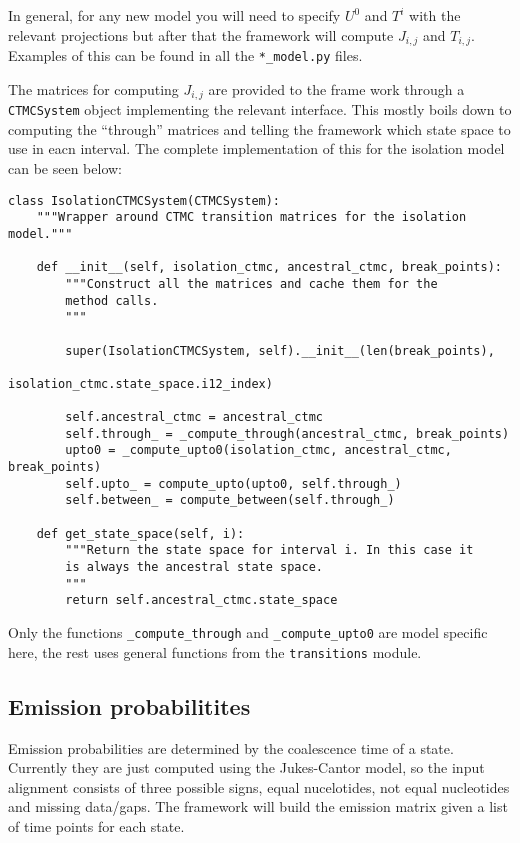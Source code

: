 \documentclass[11pt]{article}
\begin{document}
In general, for any new model you will need to specify $U^0$ and $T^i$ with the relevant projections but after that the framework will compute $J_{i,j}$ and $T_{i,j}$. Examples of this can be found in all the \texttt{*\_model.py} files.

The matrices for computing $J_{i,j}$ are provided to the frame work through a \texttt{CTMCSystem} object implementing the relevant interface. This mostly boils down to computing the ``through'' matrices and telling the framework which state space to use in eacn interval. The complete implementation of this for the isolation model can be seen below:

\begin{verbatim}
class IsolationCTMCSystem(CTMCSystem):
    """Wrapper around CTMC transition matrices for the isolation model."""

    def __init__(self, isolation_ctmc, ancestral_ctmc, break_points):
        """Construct all the matrices and cache them for the
        method calls.
        """

        super(IsolationCTMCSystem, self).__init__(len(break_points),
                                                  isolation_ctmc.state_space.i12_index)

        self.ancestral_ctmc = ancestral_ctmc
        self.through_ = _compute_through(ancestral_ctmc, break_points)
        upto0 = _compute_upto0(isolation_ctmc, ancestral_ctmc, break_points)
        self.upto_ = compute_upto(upto0, self.through_)
        self.between_ = compute_between(self.through_)

    def get_state_space(self, i):
        """Return the state space for interval i. In this case it 
        is always the ancestral state space.
        """
        return self.ancestral_ctmc.state_space
\end{verbatim}

Only the functions \texttt{\_compute\_through} and \texttt{\_compute\_upto0} are model specific here, the rest uses general functions from the \texttt{transitions} module.


\subsection{Emission probabilitites}

Emission probabilities are determined by the coalescence time of a state. Currently they are just computed using the Jukes-Cantor model, so the input alignment consists of three possible signs, equal nucelotides, not equal nucleotides and missing data/gaps. The framework will build the emission matrix given a list of time points for each state.
\end{document}

